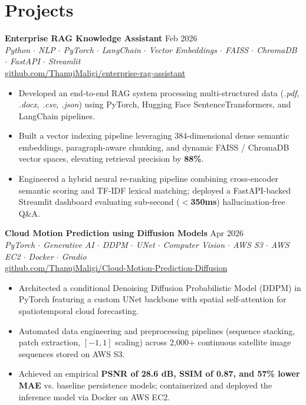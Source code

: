 \documentclass[a4paper,10pt]{article}
\begin{document}

\section*{Projects}

\textbf{Enterprise RAG Knowledge Assistant} \hfill Feb 2026\\
\textit{Python $\cdot$ NLP $\cdot$ PyTorch $\cdot$ LangChain $\cdot$ Vector Embeddings $\cdot$ FAISS $\cdot$ ChromaDB $\cdot$ FastAPI $\cdot$ Streamlit}\\
\href{https://github.com/ThanujMaligi/enterprise-rag-assistant}{github.com/ThanujMaligi/enterprise-rag-assistant}
\begin{itemize}[leftmargin=*,noitemsep,topsep=1pt,parsep=0pt,partopsep=0pt,itemsep=1pt]
\item Developed an end-to-end RAG system processing multi-structured data (\textit{.pdf, .docx, .csv, .json}) using PyTorch, Hugging Face SentenceTransformers, and LangChain pipelines.
\item Built a vector indexing pipeline leveraging 384-dimensional dense semantic embeddings, paragraph-aware chunking, and dynamic FAISS / ChromaDB vector spaces, elevating retrieval precision by \textbf{88\%}.
\item Engineered a hybrid neural re-ranking pipeline combining cross-encoder semantic scoring and TF-IDF lexical matching; deployed a FastAPI-backed Streamlit dashboard evaluating sub-second (\textbf{$<$350ms}) hallucination-free Q\&A.
\end{itemize}

\vspace{2pt}

\textbf{Cloud Motion Prediction using Diffusion Models} \hfill Apr 2026\\
\textit{PyTorch $\cdot$ Generative AI $\cdot$ DDPM $\cdot$ UNet $\cdot$ Computer Vision $\cdot$ AWS S3 $\cdot$ AWS EC2 $\cdot$ Docker $\cdot$ Gradio}\\
\href{https://github.com/ThanujMaligi/Cloud-Motion-Prediction-Diffusion}{github.com/ThanujMaligi/Cloud-Motion-Prediction-Diffusion}
\begin{itemize}[leftmargin=*,noitemsep,topsep=1pt,parsep=0pt,partopsep=0pt,itemsep=1pt]
\item Architected a conditional Denoising Diffusion Probabilistic Model (DDPM) in PyTorch featuring a custom UNet backbone with spatial self-attention for spatiotemporal cloud forecasting.
\item Automated data engineering and preprocessing pipelines (sequence stacking, patch extraction, $[-1, 1]$ scaling) across 2,000+ continuous satellite image sequences stored on AWS S3.
\item Achieved an empirical \textbf{PSNR of 28.6 dB, SSIM of 0.87, and 57\% lower MAE} vs. baseline persistence models; containerized and deployed the inference model via Docker on AWS EC2.
\end{itemize}
\end{document}
